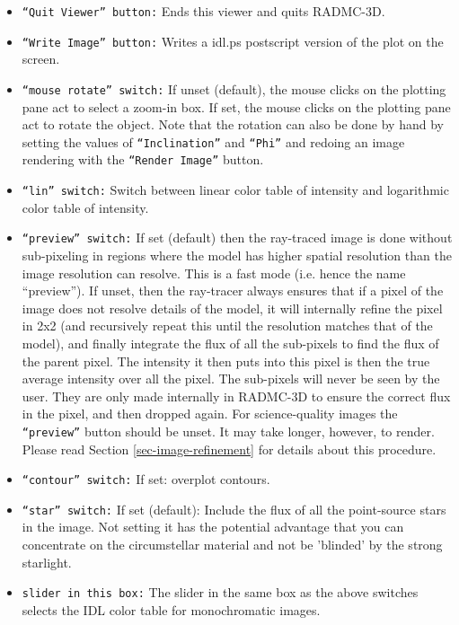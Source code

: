 \documentclass{report}
\begin{document}
\begin{itemize}
\item {\small\tt ``Quit Viewer'' button:} Ends this viewer and quits RADMC-3D.
\item {\small\tt ``Write Image'' button:} Writes a idl.ps postscript version of
  the plot on the screen.
\item {\small\tt ``mouse rotate'' switch:} If unset (default), the mouse clicks
  on the plotting pane act to select a zoom-in box. If set, the mouse clicks
  on the plotting pane act to rotate the object. Note that the rotation can
  also be done by hand by setting the values of {\small\tt ``Inclination''} and
  {\small\tt ``Phi''} and redoing an image rendering with the {\small\tt ``Render
    Image''} button.
\item {\small\tt ``lin'' switch:} Switch between linear color table of intensity
  and logarithmic color table of intensity. 
\item {\small\tt ``preview'' switch:} If set (default) then the ray-traced image
  is done without sub-pixeling in regions where the model has higher spatial
  resolution than the image resolution can resolve. This is a fast mode (i.e.
  hence the name ``preview''). If unset, then the ray-tracer always ensures
  that if a pixel of the image does not resolve details of the model, it will
  internally refine the pixel in 2x2 (and recursively repeat this until the
  resolution matches that of the model), and finally integrate the flux of
  all the sub-pixels to find the flux of the parent pixel. The intensity it
  then puts into this pixel is then the true average intensity over all the
  pixel. The sub-pixels will never be seen by the user. They are only made
  internally in RADMC-3D to ensure the correct flux in the pixel, and then
  dropped again. For science-quality images the {\small\tt ``preview''} button
  should be unset. It may take longer, however, to render. Please read 
  Section \ref{sec-image-refinement} for details about this procedure.
\item {\small\tt ``contour'' switch:} If set: overplot contours.
\item {\small\tt ``star'' switch:} If set (default): Include the flux of all the
  point-source stars in the image. Not setting it has the potential
  advantage that you can concentrate on the circumstellar material and not 
  be 'blinded' by the strong starlight.
\item {\small\tt slider in this box:} The slider in the same box as the above
  switches selects the IDL color table for monochromatic images.

\end{itemize}
\end{document}
